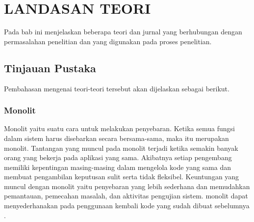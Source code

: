 \chapter{LANDASAN TEORI}
\vspace{4.5pt}
Pada bab ini menjelaskan beberapa teori dan jurnal yang berhubungan dengan permasalahan penelitian dan yang digunakan pada proses penelitian.
\section{Tinjauan Pustaka}
Pembahasan mengenai teori-teori tersebut akan dijelaskan sebagai berikut.
\subsection{Monolit}
Monolit yaitu suatu cara untuk melakukan penyebaran. Ketika semua fungsi dalam sistem harus disebarkan secara bersama-sama, maka itu merupakan monolit. Tantangan yang muncul pada monolit terjadi ketika semakin banyak orang yang bekerja pada aplikasi yang sama. Akibatnya setiap pengembang memiliki kepentingan masing-masing dalam mengelola kode yang sama dan membuat pengambilan keputusan sulit serta tidak fleksibel. Keuntungan yang muncul dengan monolit yaitu penyebaran yang lebih sederhana dan memudahkan pemantauan, pemecahan masalah, dan aktivitas pengujian sistem. monolit dapat menyederhanakan pada penggunaan kembali kode yang sudah dibuat sebelumnya \cite{6}.

